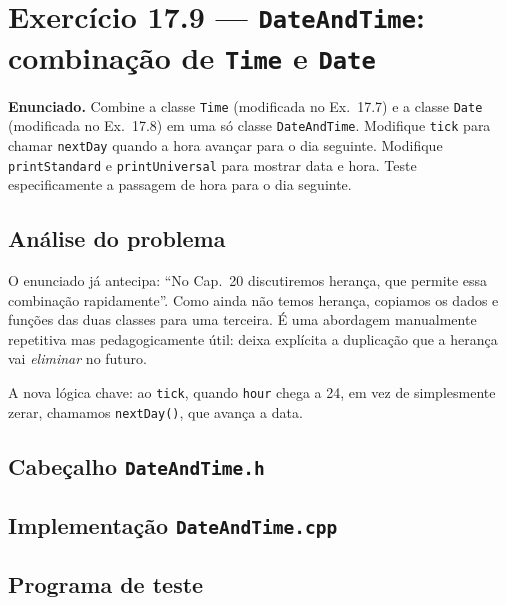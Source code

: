 \documentclass[11pt,a4paper]{article}
\begin{document}
\newpage
\section{Exerc\'icio 17.9 --- \texttt{DateAndTime}: combina\c{c}\~ao de \texttt{Time} e \texttt{Date}}

\begin{enunciado}
\textbf{Enunciado.} Combine a classe \texttt{Time} (modificada no Ex.~17.7) e a classe \texttt{Date} (modificada no Ex.~17.8) em uma s\'o classe \texttt{DateAndTime}. Modifique \texttt{tick} para chamar \texttt{nextDay} quando a hora avan\c{c}ar para o dia seguinte. Modifique \texttt{printStandard} e \texttt{printUniversal} para mostrar data e hora. Teste especificamente a passagem de hora para o dia seguinte.
\end{enunciado}

\subsection*{An\'alise do problema}

O enunciado j\'a antecipa: ``No Cap.~20 discutiremos heran\c{c}a, que permite essa combina\c{c}\~ao rapidamente''. Como ainda n\~ao temos heran\c{c}a, copiamos os dados e fun\c{c}\~oes das duas classes para uma terceira. \'E uma abordagem manualmente repetitiva mas pedagogicamente \'util: deixa expl\'icita a duplica\c{c}\~ao que a heran\c{c}a vai \emph{eliminar} no futuro.

A nova l\'ogica chave: ao \texttt{tick}, quando \texttt{hour} chega a 24, em vez de simplesmente zerar, chamamos \texttt{nextDay()}, que avan\c{c}a a data.

\subsection*{Cabe\c{c}alho \texttt{DateAndTime.h}}



\subsection*{Implementa\c{c}\~ao \texttt{DateAndTime.cpp}}



\subsection*{Programa de teste}
\end{document}
